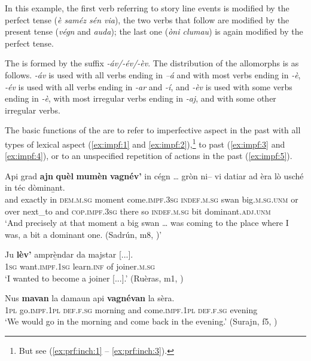 In this example, the first verb referring to story line events is modified by the perfect tense (\textit{è saméz sén via}), the two verbs that follow are modified by the present tense (\textit{végn} and \textit{auda}); the last one (\textit{òni clumau}) is again modified by the perfect tense.

\label{sec:4.1.2.2.2}
The  is formed by the suffix \textit{-áv/-év/-èv}. The distribution of the allomorphs is as follows. \textit{-áv} is used with all verbs ending in \textit{--á} and with most verbs ending in \textit{-è},  \textit{-év} is used with all verbs ending in \textit{-ar} and \textit{-í}, and \textit{-èv} is used with some verbs ending in \textit{-è}, with most irregular verbs ending in \textit{-aj}, and with some other irregular verbs.

The basic functions of the  are to refer to imperfective aspect in the past with all types of lexical aspect (\ref{ex:impf:1} and \ref{ex:impf:2}),\footnote{But see (\ref{ex:prf:inch:1} -- \ref{ex:prf:inch:3}).} to past  (\ref{ex:impf:3} and \ref{ex:impf:4}), or to an unspecified repetition of actions in the past (\ref{ex:impf:5}).
	
\ea\label{ex:impf:1}
\gll Api grad \textbf{ajn} \textbf{quèl} \textbf{mumèn} \textbf{vagnév’} in cégn … gròn ni– vi datiar ad èra lò usché in téc dòmina̱nt.\\
and exactly in \textsc{dem.m.sg} moment come.\textsc{impf.3sg} \textsc{indef.m.sg} swan {} big.\textsc{m.sg.unm} or over next\_to and \textsc{cop.impf.3sg} there so \textsc{indef.m.sg} bit dominant.\textsc{adj.unm}\\
\glt `And precisely at that moment a big swan … was coming to the place where I was, a bit a dominant one. (Sadrún, m8, )'
\z

\ea\label{ex:impf:2}
\gll    Ju \textbf{lèv’} amprè̱ndar da majstar [...].\\
\textsc{1sg} want.\textsc{impf.1sg} learn.\textsc{inf} of joiner.\textsc{m.sg}\\
\glt `I wanted to become a joiner [...].' (Ruèras, m1, )
\z

\ea\label{ex:impf:3}
\gll    Nus \textbf{mavan} la damaun api \textbf{vagnévan} la sèra. \\
\textsc{1pl} go.\textsc{impf.1pl}  \textsc{def.f.sg} morning and come.\textsc{impf.1pl} \textsc{def.f.sg} evening \\
\glt `We would go in the morning and come back in the evening.' (Surajn, f5, )
\z

